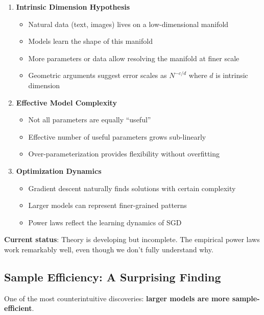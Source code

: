 \documentclass{article}
\begin{document}
\begin{enumerate}
\item \textbf{Intrinsic Dimension Hypothesis}
\begin{itemize}
\item Natural data (text, images) lives on a low-dimensional manifold
\item Models learn the shape of this manifold
\item More parameters or data allow resolving the manifold at finer scale
\item Geometric arguments suggest error scales as $N^{-c/d}$ where $d$ is intrinsic dimension
\end{itemize}

\item \textbf{Effective Model Complexity}
\begin{itemize}
\item Not all parameters are equally ``useful''
\item Effective number of useful parameters grows sub-linearly
\item Over-parameterization provides flexibility without overfitting
\end{itemize}

\item \textbf{Optimization Dynamics}
\begin{itemize}
\item Gradient descent naturally finds solutions with certain complexity
\item Larger models can represent finer-grained patterns
\item Power laws reflect the learning dynamics of SGD
\end{itemize}
\end{enumerate}

\textbf{Current status}: Theory is developing but incomplete. The empirical power laws work remarkably well, even though we don't fully understand why.

\subsection{Sample Efficiency: A Surprising Finding}

One of the most counterintuitive discoveries: \textbf{larger models are more sample-efficient}.
\end{document}
